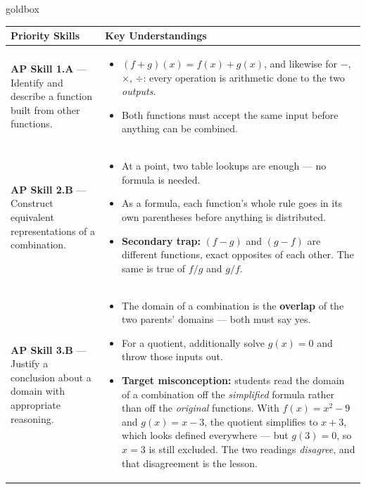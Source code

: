 \documentclass[10pt]{article}
\begin{document}
\renewcommand{\arraystretch}{1.6}
\begin{skillbox}{goldbox}
\begin{tabularx}{\linewidth}{@{}X X@{}}
\textbf{Priority Skills} &
\textbf{Key Understandings} \\
\midrule
\textbf{AP Skill 1.A} --- Identify and describe a function built from other functions. &
\begin{itemize}[leftmargin=1.2em,itemsep=2pt,topsep=0pt]
  \item $(f+g)(x) = f(x) + g(x)$, and likewise for $-$, $\times$, $\div$: every
        operation is arithmetic done to the two \textit{outputs}.
  \item Both functions must accept the same input before anything can be
        combined.
\end{itemize} \\
\textbf{AP Skill 2.B} --- Construct equivalent representations of a combination. &
\begin{itemize}[leftmargin=1.2em,itemsep=2pt,topsep=0pt]
  \item At a point, two table lookups are enough --- no formula is needed.
  \item As a formula, each function's whole rule goes in its own parentheses
        before anything is distributed.
  \item \textbf{Secondary trap:} $(f-g)$ and $(g-f)$ are different functions,
        exact opposites of each other. The same is true of $f/g$ and $g/f$.
\end{itemize} \\
\textbf{AP Skill 3.B} --- Justify a conclusion about a domain with appropriate reasoning. &
\begin{itemize}[leftmargin=1.2em,itemsep=2pt,topsep=0pt]
  \item The domain of a combination is the \textbf{overlap} of the two parents'
        domains --- both must say yes.
  \item For a quotient, additionally solve $g(x) = 0$ and throw those inputs out.
  \item \textbf{Target misconception:} students read the domain of a combination
        off the \textit{simplified} formula rather than off the \textit{original}
        functions. With $f(x) = x^2 - 9$ and $g(x) = x - 3$, the quotient
        simplifies to $x + 3$, which looks defined everywhere --- but $g(3) = 0$,
        so $x = 3$ is still excluded. The two readings \emph{disagree}, and that
        disagreement is the lesson.
\end{itemize} \\
\end{tabularx}
\end{skillbox}
\end{document}
